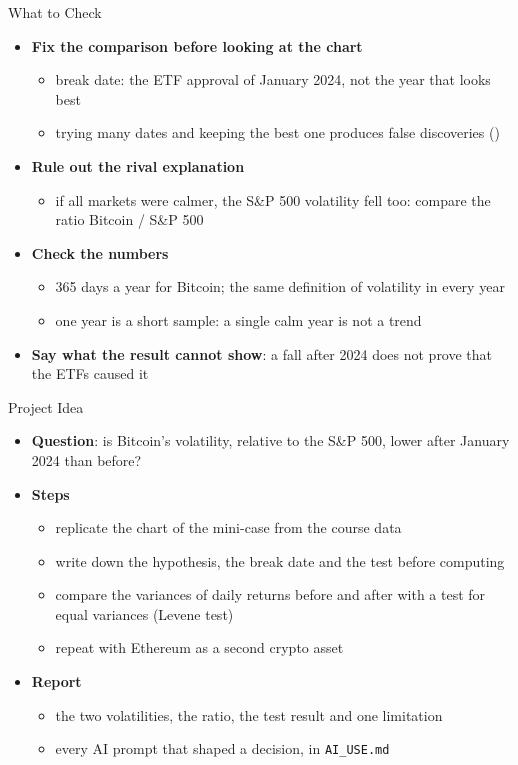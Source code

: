 \begin{frame}{What to Check}
\itemsize{\small}
\begin{itemize}
    \item \textbf{Fix the comparison before looking at the chart}
    \begin{itemize}
        \item break date: the ETF approval of January 2024, not the year that looks best
        \item trying many dates and keeping the best one produces false discoveries ()
    \end{itemize}
    \item \textbf{Rule out the rival explanation}
    \begin{itemize}
        \item if all markets were calmer, the S\&P 500 volatility fell too: compare the ratio Bitcoin / S\&P 500
    \end{itemize}
    \item \textbf{Check the numbers}
    \begin{itemize}
        \item 365 days a year for Bitcoin; the same definition of volatility in every year
        \item one year is a short sample: a single calm year is not a trend
    \end{itemize}
    \item \textbf{Say what the result cannot show}: a fall after 2024 does not prove that the ETFs caused it
\end{itemize}
\end{frame}

\begin{frame}{Project Idea}
\itemsize{\small}
\begin{itemize}
    \item \textbf{Question}: is Bitcoin's volatility, relative to the S\&P 500, lower after January 2024 than before?
    \item \textbf{Steps}
    \begin{itemize}
        \item replicate the chart of the mini-case from the course data
        \item write down the hypothesis, the break date and the test before computing
        \item compare the variances of daily returns before and after with a test for equal variances (Levene test)
        \item repeat with Ethereum as a second crypto asset
    \end{itemize}
    \item \textbf{Report}
    \begin{itemize}
        \item the two volatilities, the ratio, the test result and one limitation
        \item every AI prompt that shaped a decision, in \texttt{AI\_USE.md}
    \end{itemize}
\end{itemize}
\end{frame}


